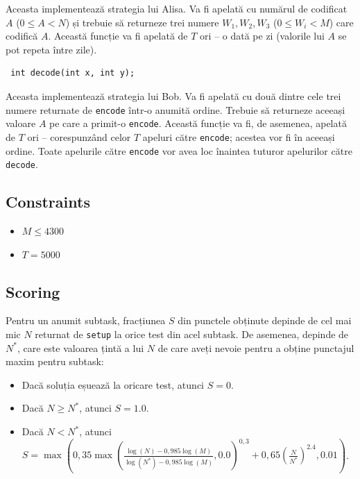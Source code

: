 \documentclass[12pt]{article}
\begin{document}
Aceasta implementează strategia lui Alisa. Va fi apelată cu numărul de codificat $A$ ($0 \leq A < N$) și trebuie să returneze trei numere $W_1, W_2, W_3$ ($0 \leq W_i < M$) care codifică $A$. Această funcție va fi apelată de $T$ ori -- o dată pe zi (valorile lui $A$ se pot repeta între zile).

\begin{lstlisting}
 int decode(int x, int y);
\end{lstlisting}

Aceasta implementează strategia lui Bob. Va fi apelată cu două dintre cele trei numere returnate de \texttt{encode} într-o anumită ordine. Trebuie să returneze aceeași valoare $A$ pe care a primit-o \texttt{encode}. Această funcție va fi, de asemenea, apelată de $T$ ori -- corespunzând celor $T$ apeluri către \texttt{encode}; acestea vor fi în aceeași ordine. Toate apelurile către \texttt{encode} vor avea loc înaintea tuturor apelurilor către \texttt{decode}.

\subsection{Constraints}

\begin{itemize}
\item $M \leq 4300$
\item $T = 5000$
\end{itemize}

\subsection{Scoring}

Pentru un anumit subtask, fracțiunea $S$ din punctele obținute depinde de cel mai mic $N$ returnat de \texttt{setup} la orice test din acel subtask. De asemenea, depinde de $N^*$, care este valoarea țintă a lui $N$ de care aveți nevoie pentru a obține punctajul maxim pentru subtask:

\begin{itemize}
\item Dacă soluția eșuează la oricare test, atunci $S = 0$.
\item Dacă $N \geq N^*$, atunci $S = 1.0$.
\item Dacă $N < N^*$, atunci $S = \max\left(0,35 \max\left(\frac{\log(N) - 0,985 \log(M)} {\log(N^*) - 0,985 \log(M)}, 0.0\right)^{0,3} + 0,65 \left(\frac{N}{N^*}\right)^{2.4}, 0.01\right)$.
\end{itemize}
\end{document}
